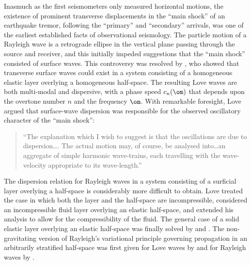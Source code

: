 Inasmuch as the
first seismometers only measured horizontal
motions, the existence of prominent transverse
displacements in the ``main shock'' of an earthquake tremor,
following the ``primary'' and ``secondary'' arrivals, was one of
the earliest established facts of observational
seismology.  The particle motion
of a Rayleigh wave is a retrograde ellipse in
the vertical plane passing through the source
and receiver, and this initially impeded suggestions
that the ``main shock'' consisted of surface waves.
This controversy was resolved by
\textcite{love11}, who showed that transverse
surface waves could exist in a system consisting
of a homogeneous elastic layer overlying a
homogeneous half-space.  The resulting Love
waves are both multi-modal and dispersive,
with a phase speed $c_n(\om)$ that depends
upon the overtone number $n$ and the frequency
$\om$.  With remarkable foresight, Love
argued that surface-wave dispersion was responsible
for the observed oscillatory character of the ``main shock'':
\begin{quote}
``The explanation which I wish to suggest is that the
oscillations are due to dispersion\ldots.  The actual
motion may, of course, be analysed into\ldots an
aggregate of simple harmonic wave-trains, each
travelling with the wave-velocity appropriate
to its wave-length.''
\end{quote}
The dispersion relation for Rayleigh waves in a system
consisting of a surficial layer overlying a half-space
is considerably more difficult to obtain.  Love treated
the case in which both the layer and the half-space are
incompressible, \textcite{bromwich98} considered an incompressible
fluid layer overlying an elastic half-space, and \textcite{stoneley26a}
extended his analysis to allow for the compressibility
of the fluid.  The general case of a solid elastic layer overlying
an elastic half-space was finally solved by \textcite{sezawa27}
and \textcite{stoneley28}.  The non-gravitating version of Rayleigh's
variational principle governing propagation in an arbitrarily
stratified half-space was first given for Love waves by
\textcite{meissner26} and for Rayleigh waves by \textcite{jeffreys35}. 

